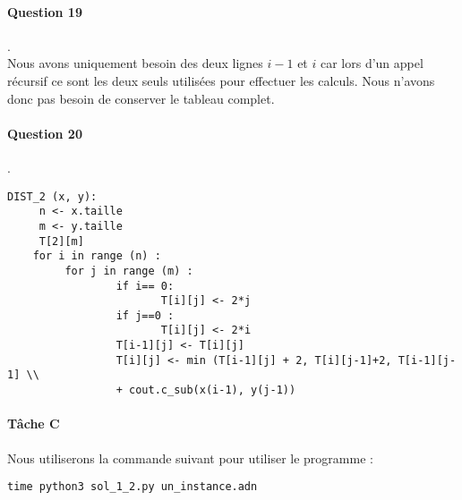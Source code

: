 \paragraph{Question 19}.\\
Nous avons uniquement besoin des deux lignes $i-1$ et $i$ car lors d'un appel récursif ce sont les deux seuls utilisées pour effectuer les calculs. Nous n'avons donc pas besoin de conserver le tableau complet.
\paragraph{Question 20}.\\
\begin{lstlisting}
DIST_2 (x, y):
     n <- x.taille
     m <- y.taille
     T[2][m]
    for i in range (n) :
         for j in range (m) :
                 if i== 0:
                        T[i][j] <- 2*j
                 if j==0 :
                        T[i][j] <- 2*i
                 T[i-1][j] <- T[i][j]
                 T[i][j] <- min (T[i-1][j] + 2, T[i][j-1]+2, T[i-1][j-1] \\
                 + cout.c_sub(x(i-1), y(j-1))
\end{lstlisting}
\paragraph{Tâche C}
Nous utiliserons la commande suivant pour utiliser le programme :
\begin{lstlisting}
time python3 sol_1_2.py un_instance.adn
\end{lstlisting}
